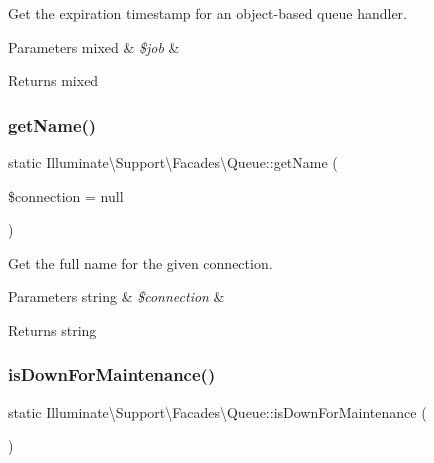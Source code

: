 Get the expiration timestamp for an object-\/based queue handler.


\begin{DoxyParams}[1]{Parameters}
mixed & {\em \$job} & \\
\hline
\end{DoxyParams}
\begin{DoxyReturn}{Returns}
mixed 
\end{DoxyReturn}
\mbox{\label{class_illuminate_1_1_support_1_1_facades_1_1_queue_a86e8629ef502a46f0a4c9255e740b550}} 
\subsubsection{\texorpdfstring{get\+Name()}{getName()}}
{\footnotesize\ttfamily static Illuminate\textbackslash{}\+Support\textbackslash{}\+Facades\textbackslash{}\+Queue\+::get\+Name (\begin{DoxyParamCaption}\item[{}]{\$connection = {\ttfamily null} }\end{DoxyParamCaption})\hspace{0.3cm}{\ttfamily [static]}}

Get the full name for the given connection.


\begin{DoxyParams}[1]{Parameters}
string & {\em \$connection} & \\
\hline
\end{DoxyParams}
\begin{DoxyReturn}{Returns}
string 
\end{DoxyReturn}
\mbox{\label{class_illuminate_1_1_support_1_1_facades_1_1_queue_a07ac76a4da451f5a76cfe17ea32bccd0}} 
\subsubsection{\texorpdfstring{is\+Down\+For\+Maintenance()}{isDownForMaintenance()}}
{\footnotesize\ttfamily static Illuminate\textbackslash{}\+Support\textbackslash{}\+Facades\textbackslash{}\+Queue\+::is\+Down\+For\+Maintenance (\begin{DoxyParamCaption}{ }\end{DoxyParamCaption})\hspace{0.3cm}{\ttfamily [static]}}

